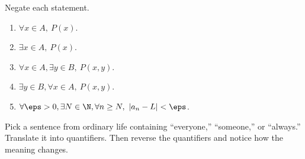 Negate each statement.

\begin{enumerate}
\item $\forall x\in A,\ P(x)$.
\item $\exists x\in A,\ P(x)$.
\item $\forall x\in A,\exists y\in B,\ P(x,y)$.
\item $\exists y\in B,\forall x\in A,\ P(x,y)$.
\item $\forall \eps>0,\exists N\in\N,\forall n\geq N,\ |a_n-L|<\eps$.
\end{enumerate}

\begin{walkbox}
Pick a sentence from ordinary life containing ``everyone,'' ``someone,'' or ``always.'' Translate it into quantifiers. Then reverse the quantifiers and notice how the meaning changes.
\end{walkbox}
